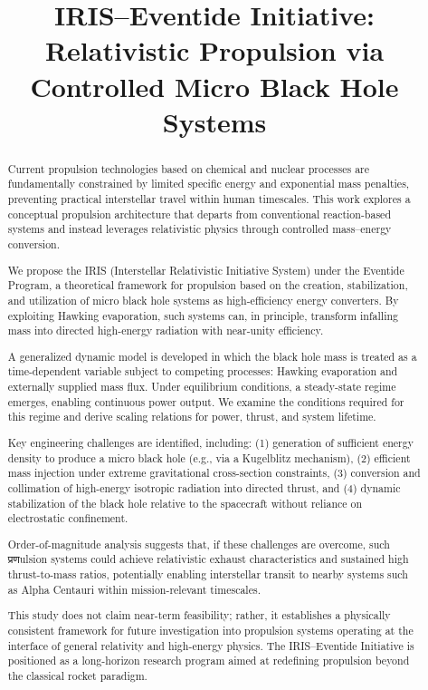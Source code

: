 \documentclass[conference]{IEEEtran}
\title{IRIS--Eventide Initiative: Relativistic Propulsion via Controlled Micro Black Hole Systems}
\begin{document}
\maketitle

\begin{abstract}
Current propulsion technologies based on chemical and nuclear processes are fundamentally constrained by limited specific energy and exponential mass penalties, preventing practical interstellar travel within human timescales. This work explores a conceptual propulsion architecture that departs from conventional reaction-based systems and instead leverages relativistic physics through controlled mass–energy conversion.

We propose the IRIS (Interstellar Relativistic Initiative System) under the Eventide Program, a theoretical framework for propulsion based on the creation, stabilization, and utilization of micro black hole systems as high-efficiency energy converters. By exploiting Hawking evaporation, such systems can, in principle, transform infalling mass into directed high-energy radiation with near-unity efficiency.

A generalized dynamic model is developed in which the black hole mass is treated as a time-dependent variable subject to competing processes: Hawking evaporation and externally supplied mass flux. Under equilibrium conditions, a steady-state regime emerges, enabling continuous power output. We examine the conditions required for this regime and derive scaling relations for power, thrust, and system lifetime.

Key engineering challenges are identified, including: (1) generation of sufficient energy density to produce a micro black hole (e.g., via a Kugelblitz mechanism), (2) efficient mass injection under extreme gravitational cross-section constraints, (3) conversion and collimation of high-energy isotropic radiation into directed thrust, and (4) dynamic stabilization of the black hole relative to the spacecraft without reliance on electrostatic confinement.

Order-of-magnitude analysis suggests that, if these challenges are overcome, such प्रणulsion systems could achieve relativistic exhaust characteristics and sustained high thrust-to-mass ratios, potentially enabling interstellar transit to nearby systems such as Alpha Centauri within mission-relevant timescales.

This study does not claim near-term feasibility; rather, it establishes a physically consistent framework for future investigation into propulsion systems operating at the interface of general relativity and high-energy physics. The IRIS–Eventide Initiative is positioned as a long-horizon research program aimed at redefining propulsion beyond the classical rocket paradigm.
\end{abstract}
\end{document}
